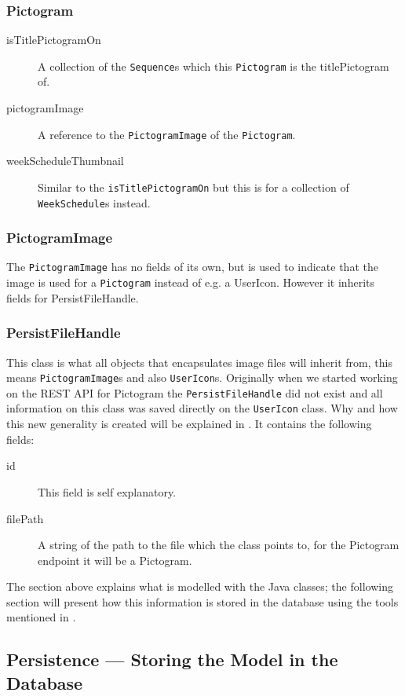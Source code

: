 \subsubsection*{Pictogram}
	\begin{description}
		\item[isTitlePictogramOn] A collection of the \texttt{Sequence}s which this \texttt{Pictogram} is the titlePictogram of.
		\item[pictogramImage] A reference to the \texttt{PictogramImage} of the \texttt{Pictogram}.
		\item[weekScheduleThumbnail] Similar to the \texttt{isTitlePictogramOn} but this is for a collection of \texttt{WeekSchedule}s instead.
	\end{description}

\subsubsection*{PictogramImage}
The \texttt{PictogramImage} has no fields of its own, but is used to indicate that the image is used for a \texttt{Pictogram} instead of e.g. a UserIcon.
However it inherits fields for PersistFileHandle.

\subsubsection*{PersistFileHandle}
This class is what all objects that encapsulates image files will inherit from, this means \texttt{PictogramImage}s and also \texttt{UserIcon}s.
Originally when we started working on the REST API for Pictogram the \texttt{PersistFileHandle} did not exist and all information on this class was saved directly on the \texttt{UserIcon} class.
Why and how this new generality is created will be explained in .
It contains the following fields:
\begin{description}
	\item[id] This field is self explanatory.
	\item[filePath] A string of the path to the file which the class points to, for the Pictogram endpoint it will be a Pictogram.
\end{description}

The section above explains what is modelled with the Java classes; the following section will present how this information is stored in the database using the tools mentioned in .

\subsection{Persistence --- Storing the Model in the Database}

